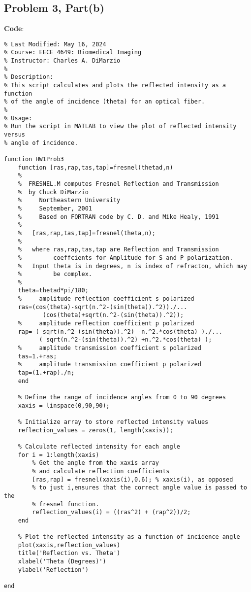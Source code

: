 \documentclass[12pt]{article}
\begin{document}
\subsection*{Problem 3, Part(b)}
\textbf{Code}:
\begin{lstlisting}[style=Matlab-editor]
% Date Created: May 13, 2024
% Last Modified: May 16, 2024
% Course: EECE 4649: Biomedical Imaging
% Instructor: Charles A. DiMarzio
%
% Description:
% This script calculates and plots the reflected intensity as a function 
% of the angle of incidence (theta) for an optical fiber.
% 
% Usage:
% Run the script in MATLAB to view the plot of reflected intensity versus 
% angle of incidence.

function HW1Prob3
    function [ras,rap,tas,tap]=fresnel(thetad,n)
    %
    %  FRESNEL.M computes Fresnel Reflection and Transmission
    %  by Chuck DiMarzio
    %     Northeastern University
    %     September, 2001
    %     Based on FORTRAN code by C. D. and Mike Healy, 1991
    %
    %   [ras,rap,tas,tap]=fresnel(theta,n);
    %
    %   where ras,rap,tas,tap are Reflection and Transmission
    %         coeffcients for Amplitude for S and P polarization.
    %   Input theta is in degrees, n is index of refracton, which may
    %         be complex.
    %
    theta=thetad*pi/180; 
    %     amplitude reflection coefficient s polarized
    ras=(cos(theta)-sqrt(n.^2-(sin(theta)).^2))./...
           (cos(theta)+sqrt(n.^2-(sin(theta)).^2));
    %     amplitude reflection coefficient p polarized
    rap=-( sqrt(n.^2-(sin(theta)).^2) -n.^2.*cos(theta) )./...
          ( sqrt(n.^2-(sin(theta)).^2) +n.^2.*cos(theta) );
    %     amplitude transmission coefficient s polarized
    tas=1.+ras;
    %     amplitude transmission coefficient p polarized
    tap=(1.+rap)./n;
    end

    % Define the range of incidence angles from 0 to 90 degrees    
    xaxis = linspace(0,90,90);

    % Initialize array to store reflected intensity values
    reflection_values = zeros(1, length(xaxis));
    
    % Calculate reflected intensity for each angle
    for i = 1:length(xaxis)
        % Get the angle from the xaxis array 
        % and calculate reflection coefficients
        [ras,rap] = fresnel(xaxis(i),0.6); % xaxis(i), as opposed 
        % to just i,ensures that the correct angle value is passed to the 
        % fresnel function.
        reflection_values(i) = ((ras^2) + (rap^2))/2;
    end

    % Plot the reflected intensity as a function of incidence angle
    plot(xaxis,reflection_values)
    title('Reflection vs. Theta')
    xlabel('Theta (Degrees)')
    ylabel('Reflection')

end\end{lstlisting}
\end{document}
